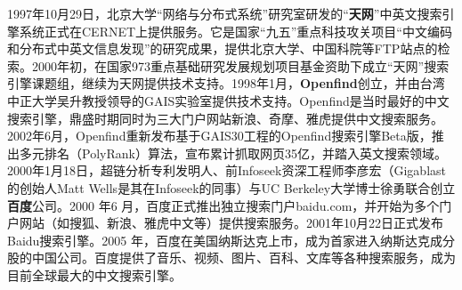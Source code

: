 \begin{shaded}
1997年10月29日，北京大学“网络与分布式系统”研究室研发的“\textbf{天网}”中英文搜索引擎系统正式在CERNET上提供服务。它是国家“九五”重点科技攻关项目“中文编码和分布式中英文信息发现”的研究成果，提供北京大学、中国科院等FTP站点的检索。2000年初，在国家973重点基础研究发展规划项目基金资助下成立“天网”搜索引擎课题组，继续为天网提供技术支持。1998年1月，\textbf{Openfind}创立，并由台湾中正大学吴升教授领导的GAIS实验室提供技术支持。Openfind是当时最好的中文搜索引擎，鼎盛时期同时为三大门户网站新浪、奇摩、雅虎提供中文搜索服务。2002年6月，Openfind重新发布基于GAIS30工程的Openfind搜索引擎Beta版，推出多元排名（PolyRank）算法，宣布累计抓取网页35亿，并踏入英文搜索领域。2000年1月18日，超链分析专利发明人、前Infoseek资深工程师李彦宏（Gigablast的创始人Matt Wells是其在Infoseek的同事）与UC Berkeley大学博士徐勇联合创立\textbf{百度}公司。2000 年6 月，百度正式推出独立搜索门户baidu.com，并开始为多个门户网站（如搜狐、新浪、雅虎中文等）提供搜索服务。2001年10月22日正式发布Baidu搜索引擎。2005 年，百度在美国纳斯达克上市，成为首家进入纳斯达克成分股的中国公司。百度提供了音乐、视频、图片、百科、文库等各种搜索服务，成为目前全球最大的中文搜索引擎。
\end{shaded}
